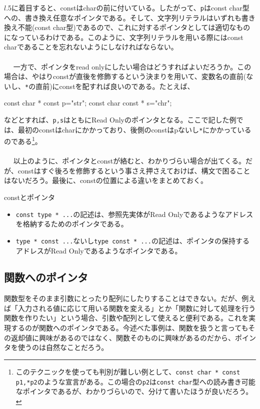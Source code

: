 $l$.5に着目すると、constはcharの前に付いている。したがって、\verb|p|はconst char型への、書き換え任意なポインタである。そして、文字列リテラルはいずれも書き換え不能(const char型)であるので、これに対するポインタとしては適切なものになっているわけである。このように、文字列リテラルを用いる際にはconst charであることを忘れないようにしなければならない。
\\ \\　
一方で、ポインタをread onlyにしたい場合はどうすればよいだろうか。この場合は、やはりconstが直後を修飾するという決まりを用いて、変数名の直前(ないし、\verb|*|の直前)にconstを配すれば良いのである。たとえば、
\begin{code}
const char * const p="str";
const char const * s="chr";
\end{code}
などとすれば、\verb|p,s|はともにRead Onlyのポインタとなる。ここで記した例では、最初のconstはcharにかかっており、後側のconstはpないし\verb|*|にかかっているのである\footnote{このテクニックを使っても判別が難しい例として、\verb|const char * const p1,*p2|のような宣言がある。この場合の\verb|p2|は\verb|const char|型への読み書き可能なポインタであるが、わかりづらいので、分けて書いたほうが良いだろう。}。
\\ \\　
以上のように、ポインタとconstが絡むと、わかりづらい場合が出てくる。だが、constはすぐ後ろを修飾するという事さえ押さえておけば、構文で困ることはないだろう。最後に、constの位置による違いをまとめておく。
\begin{itembox}[l]{constとポインタ}
\begin{itemize}
\item \verb|const type * ...|の記述は、参照先実体がRead Onlyであるようなアドレスを格納するためのポインタである。
\item \verb|type * const ...|ないし\verb|type const * ...|の記述は、ポインタの保持するアドレスがRead Onlyであるようなポインタである。
\end{itemize}
\end{itembox}

\subsection{関数へのポインタ}
関数型をそのまま引数にとったり配列にしたりすることはできない。だが、例えば「入力される値に応じて用いる関数を変える」とか「関数に対して処理を行う関数を作りたい」という場合、引数や配列として使えると便利である。これを実現するのが関数へのポインタである。今述べた事例は、関数を扱うと言ってもその返却値に興味があるのではなく、関数そのものに興味があるのだから、ポインタを使うのは自然なことだろう。

